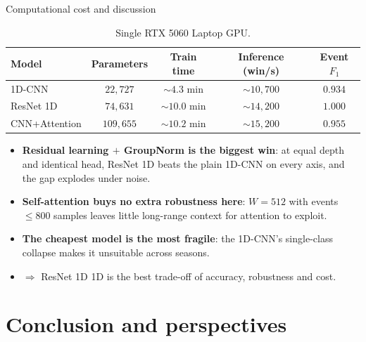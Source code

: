 \documentclass[11pt, aspectratio=169]{beamer}
\newcommand{\dCNN}{1D-CNN}
\newcommand{\dResNet}{ResNet 1D}
\newcommand{\dAttn}{CNN+Attention}
\begin{document}
\begin{frame}{Computational cost and discussion}
  \begin{table}
    \centering\footnotesize
    \begin{tabular}{lcccc}
      \toprule
      Model & Parameters & Train time & Inference (win/s) & Event $F_1$ \\
      \midrule
      \dCNN        & $22{,}727$  & $\sim 4.3$ min & $\sim 10{,}700$ & $0.934$ \\
      \dResNet     & $74{,}631$  & $\sim 10.0$ min & $\sim 14{,}200$ & $\mathbf{1.000}$ \\
      \dAttn       & $109{,}655$ & $\sim 10.2$ min & $\sim 15{,}200$ & $0.955$ \\
      \bottomrule
    \end{tabular}
    \caption*{\scriptsize Single RTX 5060 Laptop GPU.}
  \end{table}
  \begin{itemize}\footnotesize
    \item \textbf{Residual learning $+$ GroupNorm is the biggest win}: at equal
          depth and identical head, \dResNet{} beats the plain \dCNN{} on every
          axis, and the gap explodes under noise.
    \item \textbf{Self-attention buys no extra robustness here}: $W=512$ with
          events $\le 800$ samples leaves little long-range context for attention
          to exploit.
    \item \textbf{The cheapest model is the most fragile}: the \dCNN's
          single-class collapse makes it unsuitable across seasons.
    \item $\Rightarrow$ \alert{\dResNet{} 1D is the best trade-off} of accuracy,
          robustness and cost.
  \end{itemize}
\end{frame}

\section{Conclusion and perspectives}
\end{document}
